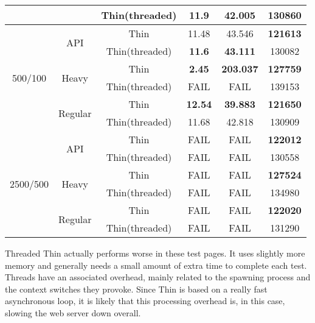 \begin{table}[h!t]
\begin{tabular}{c|c|c|c|c|c}
     &  & Thin(threaded) & 11.9 & 42.005 & 130860\\\hline
    \multirow{6}{*}{500/100} & \multirow{2}{*}{API} & Thin & 11.48 & 43.546 & \textbf{121613}\\\cline{3-6}
     &  & Thin(threaded) & \textbf{11.6} & \textbf{43.111} & 130082\\\cline{2-6}
     & \multirow{2}{*}{Heavy} & Thin & \textbf{2.45} & \textbf{203.037} & \textbf{127759}\\\cline{3-6}
     &  & Thin(threaded) & FAIL & FAIL & 139153\\\cline{2-6}
     & \multirow{2}{*}{Regular} & Thin & \textbf{12.54} & \textbf{39.883} & \textbf{121650}\\\cline{3-6}
     &  & Thin(threaded) & 11.68 & 42.818 & 130909\\\hline
    \multirow{6}{*}{2500/500} & \multirow{2}{*}{API} & Thin & FAIL & FAIL & \textbf{122012}\\\cline{3-6}
     &  & Thin(threaded) & FAIL & FAIL & 130558\\\cline{2-6}
     & \multirow{2}{*}{Heavy} & Thin & FAIL & FAIL & \textbf{127524}\\\cline{3-6}
     &  & Thin(threaded) & FAIL & FAIL & 134980\\\cline{2-6}
     & \multirow{2}{*}{Regular} & Thin & FAIL & FAIL & \textbf{122020}\\\cline{3-6}
     &  & Thin(threaded) & FAIL & FAIL & 131290\\
  \end{tabular}
\end{table}

Threaded Thin actually performs worse in these test pages. It uses slightly more memory and generally needs a small amount of extra time to complete each test. Threads have an associated overhead, mainly related to the spawning process and the context switches they provoke. Since Thin is based on a really fast asynchronous loop, it is likely that this processing overhead is, in this case, slowing the web server down overall.


